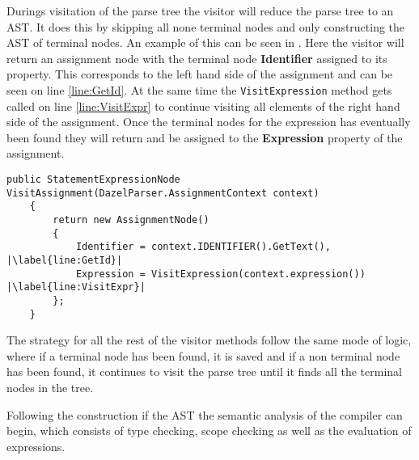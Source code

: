 Durings visitation of the parse tree the visitor will reduce the parse tree to an AST. It does this by skipping all none terminal nodes and only constructing the AST of terminal nodes. An example of this can be seen in . 
Here the visitor will return an assignment node with the terminal node \textbf{Identifier} assigned to its property. This corresponds to the left hand side of the assignment and can be seen on line \ref{line:GetId}. At the same time the \texttt{VisitExpression} method gets called on line \ref{line:VisitExpr} to continue visiting all elements of the right hand side of the assignment. Once the terminal nodes for the expression has eventually been found they will return and be assigned to the \textbf{Expression} property of the assignment.

\begin{lstlisting}[caption={Visit assignment}, label={lst:VisitAssignment},escapechar=|]
    public StatementExpressionNode VisitAssignment(DazelParser.AssignmentContext context)
    {
        return new AssignmentNode()
        {
            Identifier = context.IDENTIFIER().GetText(), |\label{line:GetId}|
            Expression = VisitExpression(context.expression()) |\label{line:VisitExpr}|
        };
    }
\end{lstlisting}

The strategy for all the rest of the visitor methods follow the same mode of logic, where if a terminal node has been found, it is saved and if a non terminal node has been found, it continues to visit the parse tree until it finds all the terminal nodes in the tree.

Following the construction if the AST the semantic analysis of the compiler can begin, which consists of type checking, scope checking as well as the evaluation of expressions.



